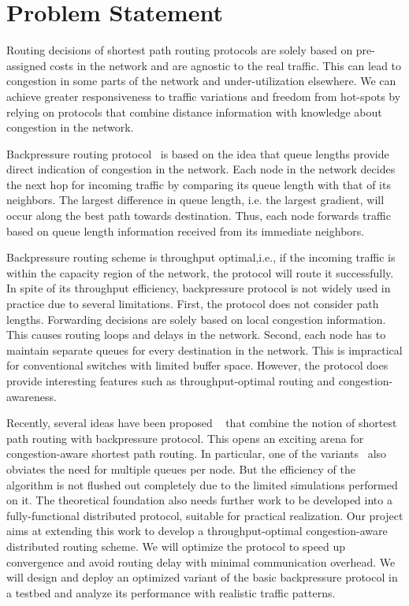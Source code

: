 \label{sec:prob}


\section*{Problem Statement}

Routing decisions of shortest path routing protocols are solely based on pre-assigned costs in the network and are agnostic to the real traffic. This can lead to congestion in some parts of the network and under-utilization elsewhere. We can achieve greater responsiveness to traffic variations and freedom from hot-spots by relying on protocols that combine distance information with knowledge about congestion in the network. 

Backpressure routing protocol~\cite{BP-orig} is based on the idea that queue lengths provide direct indication of congestion in the network. Each node in the network decides the next hop for incoming traffic by comparing its queue length with that of its neighbors. The largest difference in queue length, i.e. the largest gradient, will occur along the best path towards destination. Thus, each node forwards traffic based on queue length information received from its immediate neighbors. 

Backpressure routing scheme is throughput optimal,i.e., if the incoming traffic is within the capacity region of the network, the protocol will route it successfully. In spite of its throughput efficiency, backpressure protocol is not widely used in practice due to several limitations. First, the protocol does not consider path lengths. Forwarding decisions are solely based on local congestion information. This causes routing loops and delays in the network. Second, each node has to maintain separate queues for every destination in the network. This is impractical for conventional switches with limited buffer space. However, the protocol does provide interesting features such as throughput-optimal routing and congestion-awareness. 

Recently, several ideas have been proposed ~\cite{Srikant3, Austin1} that combine the notion of shortest path routing with backpressure protocol. This opens an exciting arena for congestion-aware shortest path routing. In particular, one of the variants~\cite{Srikant3} also obviates the need for multiple queues per node. But the efficiency of the algorithm is not flushed out completely due to the limited simulations performed on it. The theoretical foundation also needs further work to be developed into a fully-functional distributed protocol, suitable for practical realization. Our project aims at extending this work to develop a throughput-optimal congestion-aware distributed routing scheme. We will optimize the protocol to speed up convergence and avoid routing delay with minimal communication overhead. We will design and deploy an optimized variant of the basic backpressure protocol in a testbed and analyze its performance with realistic traffic patterns.  
